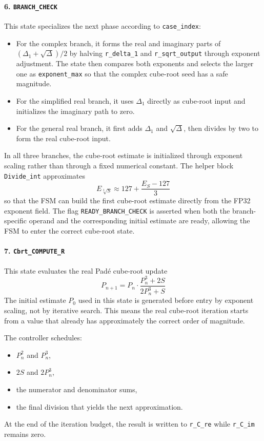 \paragraph{6. \texttt{BRANCH\_CHECK}}
This state specializes the next phase according to \texttt{case\_index}:
\begin{itemize}
    \item For the complex branch, it forms the real and imaginary parts of $(\Delta_1 + \sqrt{\Delta})/2$ by halving \texttt{r\_delta\_1} and \texttt{r\_sqrt\_output} through exponent adjustment. The state then compares both exponents and selects the larger one as \texttt{exponent\_max} so that the complex cube-root seed has a safe magnitude.
    \item For the simplified real branch, it uses $\Delta_1$ directly as cube-root input and initializes the imaginary path to zero.
    \item For the general real branch, it first adds $\Delta_1$ and $\sqrt{\Delta}$, then divides by two to form the real cube-root input.
\end{itemize}
In all three branches, the cube-root estimate is initialized through exponent scaling rather than through a fixed numerical constant. The helper block \texttt{Divide\_int} approximates
\begin{equation}
E_{\sqrt[3]{S}} \approx 127 + \frac{E_S - 127}{3}
\end{equation}
so that the FSM can build the first cube-root estimate directly from the FP32 exponent field. The flag \texttt{READY\_BRANCH\_CHECK} is asserted when both the branch-specific operand and the corresponding initial estimate are ready, allowing the FSM to enter the correct cube-root state.

\paragraph{7. \texttt{Cbrt\_COMPUTE\_R}}
This state evaluates the real Pad\'e cube-root update
\begin{equation}
P_{n+1} = P_n \cdot \frac{P_n^3 + 2S}{2P_n^3 + S}
\end{equation}
The initial estimate $P_0$ used in this state is generated before entry by exponent scaling, not by iterative search. This means the real cube-root iteration starts from a value that already has approximately the correct order of magnitude.

The controller schedules:
\begin{itemize}
    \item $P_n^2$ and $P_n^3$,
    \item $2S$ and $2P_n^3$,
    \item the numerator and denominator sums,
    \item the final division that yields the next approximation.
\end{itemize}
At the end of the iteration budget, the result is written to \texttt{r\_C\_re} while \texttt{r\_C\_im} remains zero.

